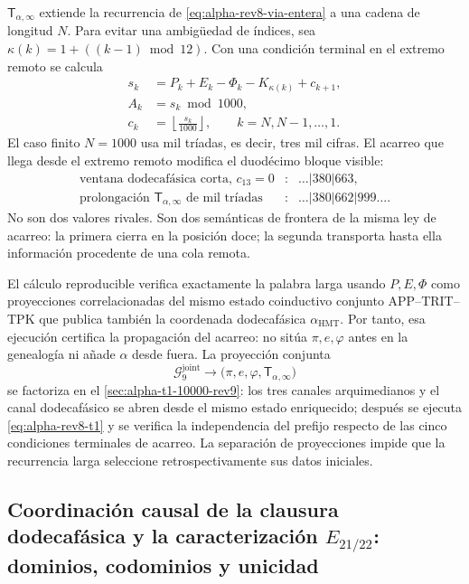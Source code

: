 \(\mathsf T_{\alpha,\infty}\) extiende la recurrencia de
\eqref{eq:alpha-rev8-via-entera} a una cadena
de longitud \(N\). Para evitar una ambigüedad de índices, sea
\(\kappa(k)=1+((k-1)\bmod12)\). Con una condición terminal en el extremo
remoto se calcula
\begin{equation}
\begin{aligned}
 s_k&=P_k+E_k-\Phi_k-K_{\kappa(k)}+c_{k+1},\\
 A_k&=s_k\bmod1000,\\
 c_k&=\left\lfloor\frac{s_k}{1000}\right\rfloor,
 \qquad k=N,N-1,\ldots,1.
\end{aligned}
\label{eq:alpha-rev8-t1}
\end{equation}
El caso finito \(N=1000\) usa mil tríadas, es decir, tres mil cifras. El
acarreo que llega desde el extremo remoto modifica el duodécimo
bloque visible:
\[
\begin{array}{rcl}
\text{ventana dodecafásica corta, }c_{13}=0
 &:& \ldots|380|663,\\
\text{prolongación }\mathsf T_{\alpha,\infty}\text{ de mil tríadas}
 &:& \ldots|380|662|999\ldots.
\end{array}
\]
No son dos valores rivales. Son dos semánticas de frontera de la misma ley de
acarreo: la primera cierra en la posición doce; la segunda transporta hasta
ella información procedente de una cola remota.

El cálculo reproducible verifica exactamente la palabra larga usando
\(P,E,\Phi\) como proyecciones correlacionadas del mismo estado coinductivo
conjunto APP--TRIT--TPK que publica también la coordenada dodecafásica
\(\alpha_{\mathrm{HMT}}\). Por tanto, esa ejecución certifica la propagación
del acarreo: no sitúa \(\pi,e,\varphi\) antes en la genealogía ni añade
\(\alpha\) desde fuera. La proyección conjunta
\[
 \mathcal G_9^{\mathrm{joint}}\longrightarrow
 \bigl(\pi,e,\varphi,\mathsf T_{\alpha,\infty}\bigr)
\]
se factoriza en el \cref{sec:alpha-t1-10000-rev9}: los tres canales
arquimedianos y el canal dodecafásico se abren desde el mismo estado
enriquecido; después se ejecuta \eqref{eq:alpha-rev8-t1} y se verifica la
independencia del prefijo respecto de las cinco condiciones terminales de
acarreo. La separación de proyecciones impide que la recurrencia larga
seleccione retrospectivamente sus datos iniciales.

\subsection{Coordinación causal de la clausura dodecafásica y la caracterización \texorpdfstring{\(E_{21/22}\)}{E21/22}: dominios, codominios y unicidad}

